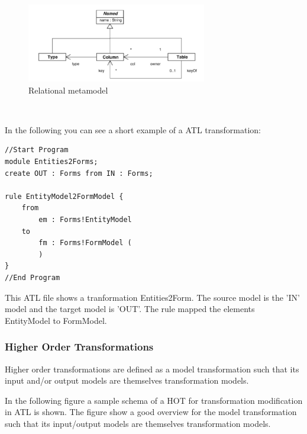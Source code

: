 \documentclass{llncs}
\begin{document}
\begin{figure}
	\centering
	\includegraphics[width=0.7\textwidth,natwidth=610,natheight=642]{figures/Relational_metamodel.jpg}
	\caption{Relational metamodel}
	\label{fig:relational_metamodel_atl}
\end{figure}~\cite{atl:frederic}

In the following you can see a short example of a ATL transformation:
\begin{verbatim}
//Start Program
module Entities2Forms;
create OUT : Forms from IN : Forms;

rule EntityModel2FormModel {
	from
		em : Forms!EntityModel
	to 
		fm : Forms!FormModel (
		)
}
//End Program
\end{verbatim}

This ATL file shows a tranformation Entities2Form. The source model is the 'IN'
model and the target model is 'OUT'. The rule mapped the elements EntityModel to
FormModel. 


\subsubsection{Higher Order Transformations}

Higher order transformations are defined as a model transformation such that
its input and/or output models are themselves transformation models.\cite{Tisi:2009}

In the following figure a sample schema of a HOT for transformation modification
in ATL is shown. The figure show a good overview for the model transformation
such that its input/output models are themselves transformation models.
\end{document}
